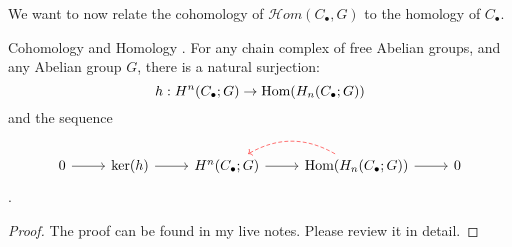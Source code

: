\documentclass{article}
\begin{document}
We want to now relate the cohomology of $\mathcal{H}om(C_{\bullet}, G)$ to the homology of $C_{\bullet}$.

\begin{Lemma}{Cohomology and Homology}
. For any chain complex of free Abelian groups, and any Abelian group $G$, there is a natural surjection:
\begin{equation}
  h : H^n(C_{\bullet}; G) \rightarrow \text{\normalfont Hom}(H_n(C_\bullet; G))
\end{equation}
and the sequence
\begin{equation}
  \begin{tikzcd}
    0 \ar[r] & \ker(h) \ar[r] & H^n(C_{\bullet}; G) \ar[r] & \ar[l, dashed, red, bend right=30] \text{\normalfont Hom}(H_{n}(C_{\bullet}; G)) \ar[r] & 0
  \end{tikzcd}
\end{equation}
.
\end{Lemma}

\begin{proof}
  The proof can be found in my live notes. Please review it in detail.
\end{proof}

\printindex
\end{document}
